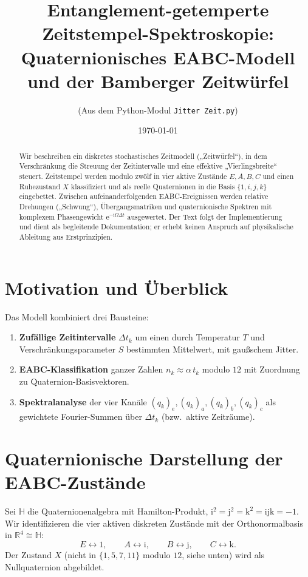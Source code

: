 \documentclass[11pt,a4paper]{article}
\title{Entanglement-getemperte Zeitstempel-Spektroskopie:\\
  Quaternionisches EABC-Modell und der Bamberger Zeitwürfel}
\author{(Aus dem Python-Modul \texttt{Jitter Zeit.py})}
\date{\today}
\begin{document}
\maketitle

\begin{abstract}
  Wir beschreiben ein diskretes stochastisches Zeitmodell („Zeitwürfel“), in dem
  Verschränkung die Streuung der Zeitintervalle und eine effektive
  „Vierlingsbreite“ steuert. Zeitstempel werden modulo zwölf in vier aktive
  Zustände $E,A,B,C$ und einen Ruhezustand $X$ klassifiziert und als reelle
  Quaternionen in die Basis $\{1,i,j,k\}$ eingebettet. Zwischen aufeinanderfolgenden
  EABC-Ereignissen werden relative Drehungen („Schwung“), Übergangsmatriken und
  quaternionische Spektren mit komplexem Phasengewicht $\mathrm{e}^{-\mathrm{i}\Omega\Delta t}$
  ausgewertet. Der Text folgt der Implementierung und dient als begleitende
  Dokumentation; er erhebt keinen Anspruch auf physikalische Ableitung aus
  Erstprinzipien.
\end{abstract}

\section{Motivation und Überblick}

Das Modell kombiniert drei Bausteine:
\begin{enumerate}
  \item \textbf{Zufällige Zeitintervalle} $\Delta t_k$ um einen durch Temperatur $T$ und
    Verschränkungsparameter $S$ bestimmten Mittelwert, mit gaußschem Jitter.
  \item \textbf{EABC-Klassifikation} ganzer Zahlen $n_k \approx \alpha\, t_k$ modulo $12$
    mit Zuordnung zu Quaternion-Basisvektoren.
  \item \textbf{Spektralanalyse} der vier Kanäle $(q_k)_e,(q_k)_a,(q_k)_b,(q_k)_c$ als
    gewichtete Fourier-Summen über $\Delta t_k$ (bzw.\ aktive Zeiträume).
\end{enumerate}

\section{Quaternionische Darstellung der EABC-Zustände}

Sei $\mathbb{H}$ die Quaternionenalgebra mit Hamilton-Produkt,
$\mathrm{i}^2=\mathrm{j}^2=\mathrm{k}^2=\mathrm{ijk}=-1$.
Wir identifizieren die vier aktiven diskreten Zustände mit der Orthonormalbasis
in $\mathbb{R}^4 \cong \mathbb{H}$:
\begin{equation}
  E \leftrightarrow 1,\qquad
  A \leftrightarrow \mathrm{i},\qquad
  B \leftrightarrow \mathrm{j},\qquad
  C \leftrightarrow \mathrm{k}.
\end{equation}
Der Zustand $X$ (nicht in $\{1,5,7,11\}$ modulo $12$, siehe unten) wird als
Nullquaternion abgebildet.
\end{document}
